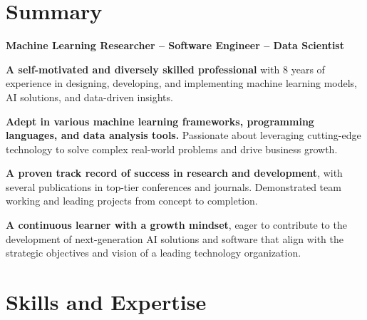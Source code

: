 \documentclass[11pt]{article}
\begin{document}
\maketitle

\section{Summary}

\begin{outerlist}
	\item \textbf{Machine Learning Researcher -- Software Engineer -- Data Scientist}
	\begin{innerlist}
		\item \textbf{A self-motivated and diversely skilled professional} with 8 years of experience in designing, developing, and implementing machine learning models, AI solutions, and data-driven insights.
    \item \textbf{Adept in various machine learning frameworks, programming languages, and data analysis tools.} Passionate about leveraging cutting-edge technology to solve complex real-world problems and drive business growth.
    \item \textbf{A proven track record of success in research and development}, with several publications in top-tier conferences and journals. Demonstrated team working and leading projects from concept to completion.
    \item \textbf{A continuous learner with a growth mindset}, eager to contribute to the development of next-generation AI solutions and software that align with the strategic objectives and vision of a leading technology organization.
	\end{innerlist}
\end{outerlist}


\section{Skills and Expertise}
\end{document}
